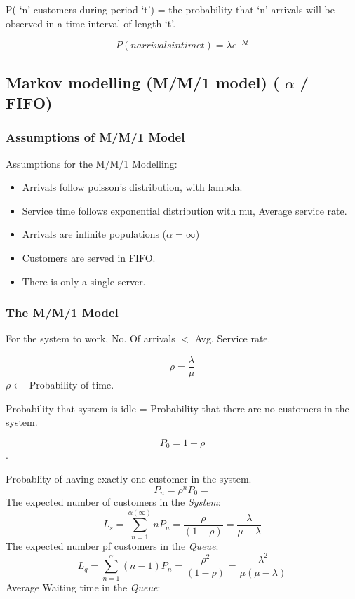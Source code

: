 \documentclass[12pt, letterpaper]{article}
\begin{document}
\begin{center}
    P( ‘n’ customers during period ‘t’) = the probability that ‘n’ arrivals will be observed in a time interval of length ‘t’.
\end{center}

\begin{equation}
    P(n arrivals in time t) = \lambda e^{-\lambda t}
\end{equation}

\subsection{Markov modelling (M/M/1 model) ( $\alpha$ / FIFO)}
\subsubsection{Assumptions of M/M/1 Model}
Assumptions for the M/M/1 Modelling:
\begin{itemize}
    \item Arrivals follow poisson’s distribution, with lambda.
    \item Service time follows exponential distribution with mu, Average service rate.
    \item Arrivals are infinite populations ($\alpha = \infty$)
    \item Customers are served in FIFO.
    \item There is only a single server.
\end{itemize}
 
\subsubsection{The M/M/1 Model}
For the system to work, No. Of arrivals $<$ Avg. Service rate.

$$\rho = \frac{\lambda}{\mu} $$ 
$ \rho \leftarrow $ Probability of time.

Probability that system is idle = Probability that there are no customers in the system.

$$P_0 = 1 - \rho$$.

Probablity of having exactly one customer in the system.
$$ P_n = \rho^n P_0  = $$
The expected number of customers in the \emph{System}:
$$ L_s =  \sum_{n=1}^{\alpha (\infty)} n P_n 
= \frac{\rho}{(1-\rho)} = \frac{\lambda}{\mu-\lambda} $$
The expected number pf customers in the \emph{Queue}:
$$ L_q = \sum_{n=1}^{\alpha} (n-1)P_n  = \frac{\rho^2}{(1 - \rho)} = \frac{\lambda^2}{\mu(\mu - \lambda)}$$
Average Waiting time in the \emph{Queue}:
\end{document}
